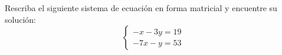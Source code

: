 \begin{problema}
	Rescriba el siguiente sistema de ecuación en forma matricial y encuentre su solución:
	$$
	\begin{cases}
		-x-3y=19\\
		-7x-y=53
	\end{cases}
	$$
\end{problema}


